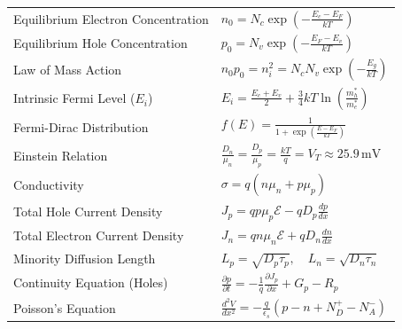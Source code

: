 \documentclass[12pt,a4paper]{article}
\renewcommand{\arraystretch}{1.45}
\begin{document}
\begin{tcolorbox}[formulabox, title={\textbf{Key Formulas and Metrics at a Glance}}]
\renewcommand{\arraystretch}{1.35}
\begin{tabularx}{\linewidth}{B{5.0cm} X}
Equilibrium Electron Concentration & $n_0 = N_c \exp\left(-\frac{E_c - E_F}{kT}\right)$ \\[4pt]
Equilibrium Hole Concentration & $p_0 = N_v \exp\left(-\frac{E_F - E_v}{kT}\right)$ \\[4pt]
Law of Mass Action & $n_0 p_0 = n_i^2 = N_c N_v \exp\left(-\frac{E_g}{kT}\right)$ \\[4pt]
Intrinsic Fermi Level ($E_i$) & $E_i = \frac{E_c + E_v}{2} + \frac{3}{4} kT \ln\left(\frac{m_h^*}{m_e^*}\right)$ \\[4pt]
Fermi-Dirac Distribution & $f(E) = \frac{1}{1 + \exp\left(\frac{E - E_F}{kT}\right)}$ \\[4pt]
Einstein Relation & $\frac{D_n}{\mu_n} = \frac{D_p}{\mu_p} = \frac{kT}{q} = V_T \approx 25.9\,\text{mV}$ \\[4pt]
Conductivity & $\sigma = q (n\mu_n + p\mu_p)$ \\[4pt]
Total Hole Current Density & $J_p = q p \mu_p \mathcal{E} - q D_p \frac{dp}{dx}$ \\[4pt]
Total Electron Current Density & $J_n = q n \mu_n \mathcal{E} + q D_n \frac{dn}{dx}$ \\[4pt]
Minority Diffusion Length & $L_p = \sqrt{D_p \tau_p}, \quad L_n = \sqrt{D_n \tau_n}$ \\[4pt]
Continuity Equation (Holes) & $\frac{\partial p}{\partial t} = -\frac{1}{q} \frac{\partial J_p}{\partial x} + G_p - R_p$ \\[4pt]
Poisson's Equation & $\frac{d^2 V}{dx^2} = -\frac{q}{\epsilon_s}(p - n + N_D^+ - N_A^-)$ \\[4pt]
\end{tabularx}
\end{tcolorbox}
\end{document}
